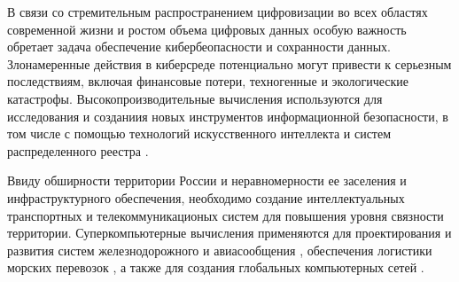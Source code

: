 \documentclass[a4paper,14pt]{extarticle}                     %
\numberwithin{equation}{section}                             %
\numberwithin{figure}{section}                               %
\numberwithin{table}{section}                                %
\theoremstyle{plain}                                         %
\numberwithin{theorem}{section}                              %
\numberwithin{lemma}{section}                                %
\numberwithin{definition}{section}                           %
\begin{document}
В связи со стремительным распространением цифровизации во всех областях современной жизни и ростом объема цифровых данных особую важность обретает задача обеспечение кибербеопасности и сохранности данных.
Злонамеренные действия в киберсреде потенциально могут привести к серьезным последствиям, включая финансовые потери, техногенные и экологические катастрофы.
Высокопроизводительные вычисления используются для исследования и созданиия новых инструментов информационной безопасности, в том числе с помощью технологий искусственного интеллекта и систем распределенного реестра \cite{Terziyska2024SuperCyber}.

Ввиду обширности территории России и неравномерности ее заселения и инфраструктурного обеспечения, необходимо создание интеллектуальных транспортных и телекоммуникационых систем для повышения уровня связности территории.
Суперкомпьютерные вычисления применяются для проектирования и развития систем железнодорожного и авиасообщения \cite{Juntana2022SuperFlight}, обеспечения логистики морских перевозок \cite{Yan2024SuperSea}, а также для создания глобальных компьютерных сетей \cite{Abramov2025SuperNets}.

\end{document}
